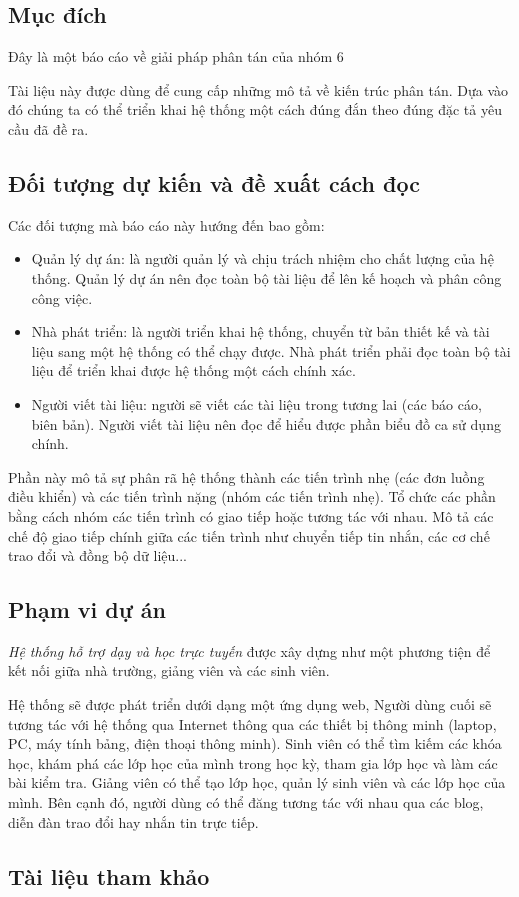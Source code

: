 \documentclass[./../main_file.tex]{subfiles}
\begin{document}
\subsection{Mục đích}

Đây là một báo cáo về giải pháp phân tán của nhóm 6

Tài liệu này được dùng để cung cấp những mô tả về kiến trúc phân tán. Dựa vào đó chúng ta có thể triển khai hệ thống một cách đúng đắn theo đúng đặc tả yêu cầu đã đề ra.

\subsection{Đối tượng dự kiến và đề xuất cách đọc}

Các đối tượng mà báo cáo này hướng đến bao gồm:
\begin{itemize}
	\item Quản lý dự án: là người quản lý và chịu trách nhiệm cho chất lượng của hệ thống. Quản lý dự án nên đọc toàn bộ tài liệu để lên kế hoạch và phân công công việc.
	\item Nhà phát triển: là người triển khai hệ thống, chuyển từ bản thiết kế và tài liệu sang một hệ thống có thể chạy được. Nhà phát triển phải đọc toàn bộ tài liệu để triển khai được hệ thống một cách chính xác.
	\item Người viết tài liệu:  người sẽ viết các tài liệu trong tương lai (các báo cáo, biên bản). Người viết tài liệu nên đọc để hiểu được phần biểu đồ ca sử dụng chính.
\end{itemize}

Phần này mô tả sự phân rã hệ thống thành các tiến trình nhẹ (các đơn luồng điều khiển) và các tiến trình nặng (nhóm các tiến trình nhẹ). Tổ chức các phần bằng cách nhóm các tiến trình có giao tiếp hoặc tương tác với nhau. Mô tả các chế độ giao tiếp chính giữa các tiến trình như chuyển tiếp tin nhắn, các cơ chế trao đổi và đồng bộ dữ liệu...

\subsection{Phạm vi dự án}

\textit{Hệ thống hỗ trợ dạy và học trực tuyến} được xây dựng như một phương tiện để kết nối giữa nhà trường, giảng viên và các sinh viên.
 
Hệ thống sẽ được phát triển dưới dạng một ứng dụng web, Người dùng cuối sẽ tương tác với hệ thống qua Internet thông qua các thiết bị thông minh (laptop, PC, máy tính bảng, điện thoại thông minh). Sinh viên có thể tìm kiếm các khóa học, khám phá các lớp học của mình trong học kỳ, tham gia lớp học và làm các bài kiểm tra. Giảng viên có thể tạo lớp học, quản lý sinh viên và các lớp học của mình. Bên cạnh đó, người dùng có thể đăng tương tác với nhau qua các blog, diễn đàn trao đổi hay nhắn tin trực tiếp.

\subsection{Tài liệu tham khảo}
\nocite{*}
\printbibliography[heading=none]

\clearpage
\end{document}
